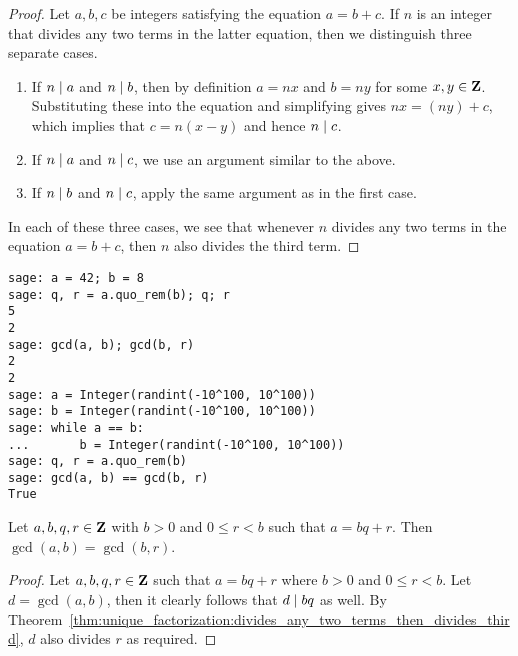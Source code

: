 \begin{proof}
Let $a,b,c$ be integers satisfying the equation $a = b + c$. If
$n$ is an integer that divides any two terms in the latter equation, then
we distinguish three separate cases.
%
\begin{enumerate}
\item If $n \;|\; a$ and $n \;|\; b$, then by definition $a = nx$ and
  $b = ny$ for some $x,y \in \mathbf{Z}$. Substituting these into the
  equation and simplifying gives $nx = (ny) + c$, which implies that
  $c = n(x - y)$ and hence $n \;|\; c$.

\item If $n \;|\; a$ and $n \;|\; c$, we use an argument similar to
  the above.

\item If $n \;|\; b$ and $n \;|\; c$, apply the same argument as in
  the first case.
\end{enumerate}
%
In each of these three cases, we see that whenever $n$ divides any
two terms in the equation $a = b + c$, then $n$ also divides the
third term.
\end{proof}

\begin{lstlisting}
sage: a = 42; b = 8
sage: q, r = a.quo_rem(b); q; r
5
2
sage: gcd(a, b); gcd(b, r)
2
2
sage: a = Integer(randint(-10^100, 10^100))
sage: b = Integer(randint(-10^100, 10^100))
sage: while a == b:
...       b = Integer(randint(-10^100, 10^100))
sage: q, r = a.quo_rem(b)
sage: gcd(a, b) == gcd(b, r)
True
\end{lstlisting}

\begin{lemma}
\label{lem:unique_factorization:gcd(a,b)_eq_gcd(b,r)}
Let $a,b,q,r \in \mathbf{Z}$ with $b > 0$ and $0 \leq r < b$ such that
$a = bq + r$. Then $\gcd(a,b) = \gcd(b,r)$.
\end{lemma}

\begin{proof}
Let $a,b,q,r \in \mathbf{Z}$ such that $a = bq + r$ where $b > 0$ and
$0 \leq r < b$. Let $d = \gcd(a,b)$, then it clearly follows that
$d \;|\; bq$ as well. By
Theorem~\ref{thm:unique_factorization:divides_any_two_terms_then_divides_third},
$d$ also divides $r$ as required.
\end{proof}

